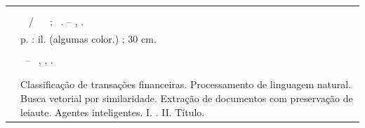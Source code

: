 %
\begin{fichacatalografica}
	\hspace{-1.4cm}
	\imprimirnotaautorizacao \\ \\
	\vspace*{\fill}					%
\begin{center}					%
  \imprimirnotabib \\
  \begin{table}[htb]
	\scriptsize
	\centering	
	\begin{tabular}{|p{0.9cm} p{8.7cm}|}
		\hline
	      & \\
		  &	  \imprimirautorficha     \\
		
		 \imprimircutter & 
							\hspace{0.4cm}\imprimirtitulo~  / ~\imprimirautor~ ;  ~\imprimirorientadorcorpoficha. -- 	\imprimirlocal, \imprimirdata.   \\
		
		  &  %
		
			\hspace{0.4cm}\pageref{LastPage} p. : il. (algumas color.) ; 30 cm.\\ 
		  & \\
		  & 
		    \hspace{0.4cm}\imprimirnotaficha ~--~ 
						  \imprimirunidademin, 
						  \imprimiruniversidademin, 
		                  \imprimirdata. \\ 
		  & \\                 
		  & \\ 
		  & \hspace{0.4cm} Classificação de transações financeiras. Processamento de linguagem natural. Busca vetorial por similaridade. Extração de documentos com preservação de leiaute. Agentes inteligentes. I. \imprimirorientadorficha.
		   II. Título. \\
	

\end{tabular}
\end{table}
\end{center}
\end{fichacatalografica}
